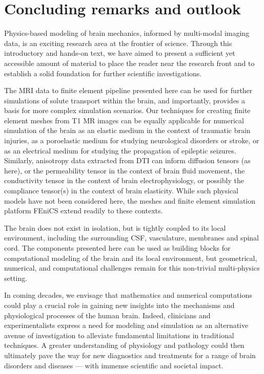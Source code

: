 \chapter{Concluding remarks and outlook}

Physics-based modeling of brain mechanics, informed by multi-modal
imaging data, is an exciting research area at the frontier of
science. Through this introductory and hands-on text, we have aimed to
present a sufficient yet accessible amount of material to place the
reader near the research front and to establish a solid foundation for
further scientific investigations.

The MRI data to finite element pipeline presented here can be used for
further simulations of solute transport within the brain, and
importantly, provides a basis for more complex simulation
scenarios. Our techniques for creating finite element meshes from T1
MR images can be equally applicable for numerical simulation of the
brain as an elastic medium in the context of traumatic brain injuries,
as a poroelastic medium for studying neurological disorders or stroke,
or as an electrical medium for studying the propagation of epileptic
seizures. Similarly, anisotropy data extracted from DTI can inform
diffusion tensors (as here), or the permeability tensor in the context
of brain fluid movement, the conductivity tensor in the context of
brain electrophysiology, or possibly the compliance tensor(s) in the
context of brain elasticity. While such physical models have not been
considered here, the meshes and finite element simulation platform
FEniCS extend readily to these contexts.

The brain does not exist in isolation, but is tightly coupled to its
local environment, including the surrounding CSF, vasculature,
membranes and spinal cord. The components presented here can be used
as building blocks for computational modeling of the brain and its
local environment, but geometrical, numerical, and computational
challenges remain for this non-trivial multi-physics setting.

In coming decades, we envisage that mathematics and numerical
computations could play a crucial role in gaining new insights into
the mechanisms and physiological processes of the human brain. Indeed,
clinicians and experimentalists express a need for modeling and
simulation as an alternative avenue of investigation to alleviate
fundamental limitations in traditional techniques. A greater
understanding of physiology and pathology could then ultimately pave
the way for new diagnostics and treatments for a range of brain
disorders and diseases --- with immense scientific and societal
impact.

